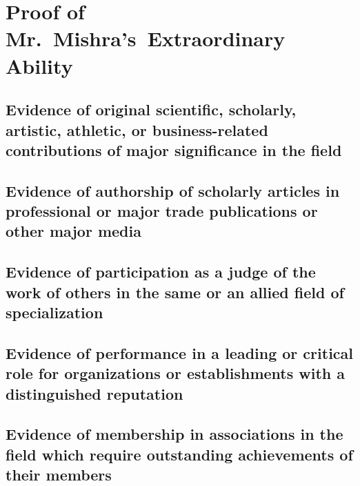\documentclass[11pt]{article}
\title{}
\date{}
\begin{document}
\newcommand{\tc}[1]{\textcolor{blue}{#1}}
\newcommand{\dr}{Mr.~Mishra\ }
\newcommand{\drs}{Mr.~Mishra's\ }

% 



\section{Proof of \drs Extraordinary Ability}

\subsection{Evidence of original scientific, scholarly, artistic, athletic, or business-related contributions of major significance in the field}
\label{sec:original}


\subsection{Evidence of authorship of scholarly articles in professional or major trade publications or other major media}
\label{sec:scholar}


\subsection{Evidence of participation as a judge of the work of others in the same or an allied field of specialization}
\label{sec:judge}


\subsection{Evidence of performance in a leading or critical role for organizations or establishments with a distinguished reputation}
\label{sec:critical}


\subsection{Evidence of membership in associations in the field which require outstanding achievements of their members}
\label{sec:member}

\end{document}
